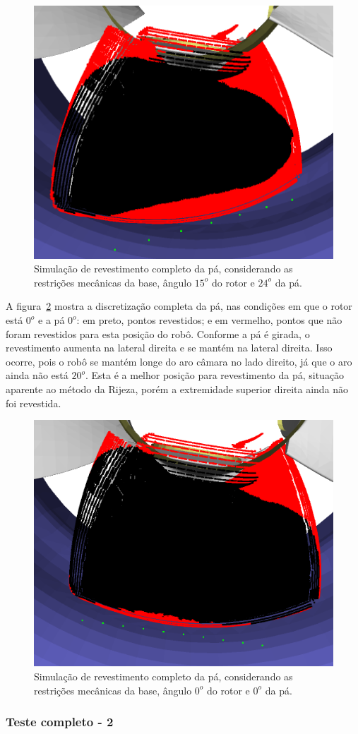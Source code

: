 \begin{figure}[!ht]
	\centering	
	\includegraphics[width=.5\columnwidth]{figs/simcomp1_2.png}
	\caption{Simulação de revestimento completo da pá, considerando as
	restrições mecânicas da base, ângulo $15^o$ do rotor e $24^o$ da pá.}
	\label{fig::simcomp1_2}
\end{figure}

A figura~\ref{fig::simcomp1_4} mostra a discretização completa da pá, nas
condições em que o rotor está $0^o$ e a pá $0^o$: em preto, pontos
revestidos; e em vermelho, pontos que não foram revestidos para esta posição do
robô. Conforme a pá é girada, o revestimento aumenta na lateral direita e se
mantém na lateral direita. Isso ocorre, pois o robô se mantém longe do aro
câmara no lado direito, já que o aro ainda não está $20^o$. Esta é a melhor
posição para revestimento da pá, situação aparente ao método da Rijeza, porém a
extremidade superior direita ainda não foi revestida.

\begin{figure}[!ht]
	\centering	
	\includegraphics[width=.5\columnwidth]{figs/simcomp1_4.png}
	\caption{Simulação de revestimento completo da pá, considerando as
	restrições mecânicas da base, ângulo $0^o$ do rotor e $0^o$ da pá.}
	\label{fig::simcomp1_4}
\end{figure}

\subsubsection{Teste completo - 2}

